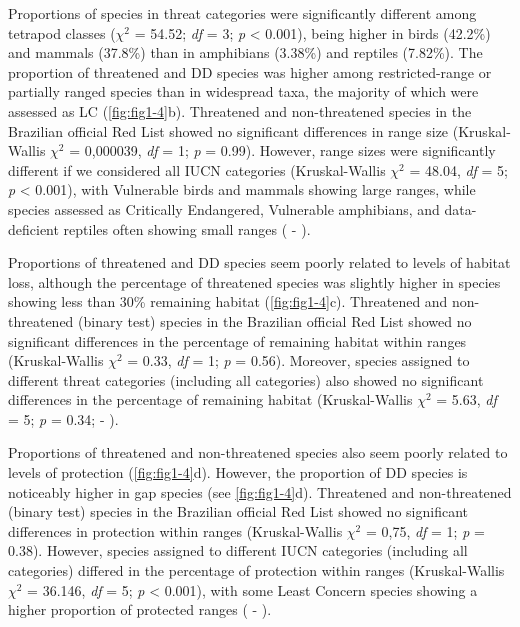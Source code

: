 \documentclass[12pt,openright,oneside,a4paper,english]{abntex2}
\begin{document}
Proportions of species in threat categories were significantly different among tetrapod classes ($\chi^2$ = 54.52; \textit{df} = 3; \textit{p} < 0.001), being higher in birds (42.2\%) and mammals (37.8\%) than in amphibians (3.38\%) and reptiles (7.82\%). The proportion of threatened and DD species was higher among restricted-range or partially ranged species than in widespread taxa, the majority of which were assessed as LC (\autoref{fig:fig1-4}b). Threatened and non-threatened species in the Brazilian official Red List showed no significant differences in range size (Kruskal-Wallis $\chi^2$ = 0,000039, \textit{df} = 1; \textit{p} = 0.99). However, range sizes were significantly different if we considered all IUCN categories (Kruskal-Wallis $\chi^2$  = 48.04, \textit{df} = 5; \textit{p} < 0.001), with Vulnerable birds and mammals showing large ranges, while species assessed as Critically Endangered, Vulnerable amphibians,  and data-deficient reptiles often showing small ranges ( - ).

Proportions of threatened and DD species seem poorly related to levels of habitat loss, although the percentage of threatened species was slightly higher in species showing less than 30\% remaining habitat (\autoref{fig:fig1-4}c). Threatened and non-threatened (binary test) species in the Brazilian official Red List showed no significant differences in the percentage of remaining habitat within ranges (Kruskal-Wallis $\chi^2$ = 0.33, \textit{df} = 1; \textit{p} = 0.56). Moreover, species assigned to different threat categories (including all categories) also showed no significant differences in the percentage of remaining habitat (Kruskal-Wallis $\chi^2$ = 5.63, \textit{df} = 5; \textit{p} = 0.34;  - ).

Proportions of threatened and non-threatened species also seem poorly related to levels of protection (\autoref{fig:fig1-4}d). However, the proportion of DD species is noticeably higher in gap species (see \autoref{fig:fig1-4}d). Threatened and non-threatened (binary test) species in the Brazilian official Red List showed no significant differences in protection within ranges (Kruskal-Wallis $\chi^2$ = 0,75, \textit{df} = 1; \textit{p} = 0.38). However, species assigned to different IUCN categories (including all categories) differed in the percentage of protection within ranges (Kruskal-Wallis $\chi^2$ = 36.146, \textit{df} = 5; \textit{p} < 0.001), with some Least Concern species showing a higher proportion of protected ranges ( - ).
\end{document}
